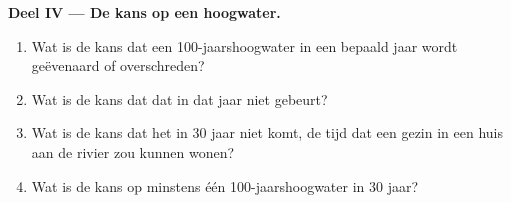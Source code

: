 \begin{problem}
\medskip
\noindent\textbf{Deel IV --- De kans op een hoogwater.}
\begin{enumerate}[resume]
  \item Wat is de kans dat een \num{100}-jaarshoogwater in een bepaald jaar
        wordt geëvenaard of overschreden?
  \item Wat is de kans dat dat in dat jaar niet gebeurt?
  \item Wat is de kans dat het in \num{30} jaar niet komt, de tijd dat een
        gezin in een huis aan de rivier zou kunnen wonen?
  \item Wat is de kans op minstens één \num{100}-jaarshoogwater in
        \num{30} jaar?
\end{enumerate}
\end{problem}
